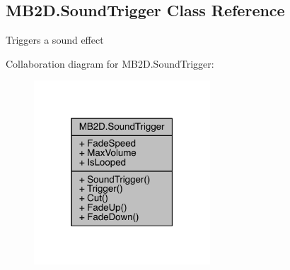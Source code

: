 \hypertarget{class_m_b2_d_1_1_sound_trigger}{}\subsection{M\+B2\+D.\+Sound\+Trigger Class Reference}
\label{class_m_b2_d_1_1_sound_trigger}


Triggers a sound effect  




Collaboration diagram for M\+B2\+D.\+Sound\+Trigger\+:
\nopagebreak
\begin{figure}[H]
\begin{center}
\leavevmode
\includegraphics[width=187pt]{class_m_b2_d_1_1_sound_trigger__coll__graph}
\end{center}
\end{figure}
